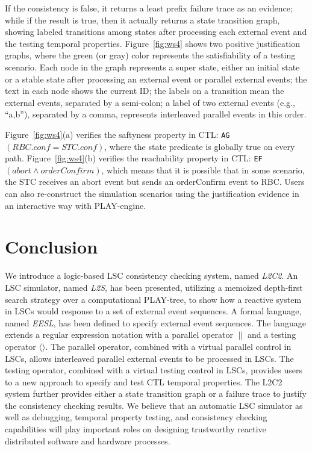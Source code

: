\documentclass[]{llncs}
\begin{document}
If the consistency is false, it returns a least prefix failure trace
as an evidence; while if the result is true, then
it actually returns a state transition graph, showing labeled transitions
among states after processing each external event and the testing temporal properties.
Figure~\ref{fig:ws4} shows two positive justification graphs,
where the green (or gray) color represents the satisfiability of a testing
scenario. Each node in the graph represents a super state, either an initial state or
a stable state after processing an external event or parallel external events;
the text in each node shows the current ID; the labels on a transition
mean the external events, separated by a semi-colon; a label of two external
events (e.g., ``a,b''), separated by a comma, represents interleaved parallel
events in this order.

Figure~\ref{fig:ws4}(a) verifies the saftyness property
in CTL: {\tt AG}$(RBC.conf=STC.conf)$, where the state
predicate is globally true on every path.
Figure~\ref{fig:ws4}(b) verifies the reachability property
in CTL: {\tt EF}$(abort\wedge orderConfirm)$,
which means that it is possible that in some scenario,
the STC receives an abort event but sends an orderConfirm event to
RBC. Users can also re-construct the simulation scenarios using the
justification evidence in an interactive way with PLAY-engine.


\section{Conclusion}
\label{sec:conclusion}


We introduce a logic-based LSC consistency checking system,
named {\em L2C2}. An LSC simulator, named {\em L2S},
has been presented, utilizing a memoized depth-first search strategy
over a computational PLAY-tree, to show how a reactive system in LSCs
would response to a set of external event sequences.
A formal language, named {\em EESL}, has been defined
to specify external event sequences. The language extends
a regular expression notation with a parallel operator $\|$
and a testing operator $\langle\rangle$.
The parallel operator, combined with a virtual parallel control in LSCs,
allows interleaved parallel external events to be processed in LSCs.
The testing operator, combined with a virtual testing control in LSCs,
provides users to a new approach to specify and test CTL temporal properties.
The L2C2 system further provides either a state transition graph or
a failure trace to justify the consistency checking results.
We believe that an automatic LSC simulator as well as
debugging, temporal property testing, and consistency checking
capabilities will play important roles on designing trustworthy
reactive distributed software and hardware processes.
\end{document}
